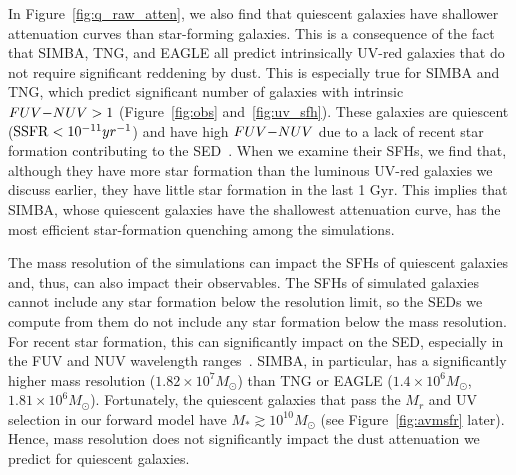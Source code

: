 In Figure~\ref{fig:q_raw_atten}, we also find that quiescent galaxies have
shallower attenuation curves than star-forming galaxies. 
This is a consequence of the fact that SIMBA, TNG, and EAGLE all predict
intrinsically UV-red galaxies that do not require significant reddening by
dust. 
This is especially true for SIMBA and TNG, which predict significant
number of galaxies with intrinsic $FUV{-}NUV > 1$ (Figure~\ref{fig:obs}
and~\ref{fig:uv_sfh}).
These galaxies are quiescent (${\rm SSFR} < 10^{-11}yr^{-1}$) and have high
$FUV{-}NUV$ due to a lack of recent star formation contributing to the
SED~\citep{leja2017}. 
When we examine their SFHs, we find that, although they have more star
formation than the luminous UV-red galaxies we discuss earlier, they have
little star formation in the last 1 Gyr. 
This implies that SIMBA, whose quiescent galaxies have the shallowest
attenuation curve, has the most efficient star-formation quenching among
the simulations. 

The mass resolution of the simulations can impact the SFHs of quiescent
galaxies and, thus, can also impact their observables.
The SFHs of simulated galaxies cannot include any star formation below the
resolution limit, so the SEDs we compute from them do not include any star
formation below the mass resolution. 
For recent star formation, this can significantly impact on the SED,
especially in the FUV and NUV wavelength ranges~\citep{leja2017}. 
SIMBA, in particular, has a significantly higher mass resolution
($1.82\times10^7M_\odot$) than TNG or EAGLE ($1.4\times10^{6}M_\odot$,
$1.81\times10^6M_\odot$).
Fortunately, the quiescent galaxies that pass the $M_r$ and UV selection
in our forward model have $M_* \gtrsim 10^{10}M_\odot$ (see
Figure~\ref{fig:avmsfr} later). 
Hence, mass resolution does not significantly impact the dust attenuation
we predict for quiescent galaxies.  

